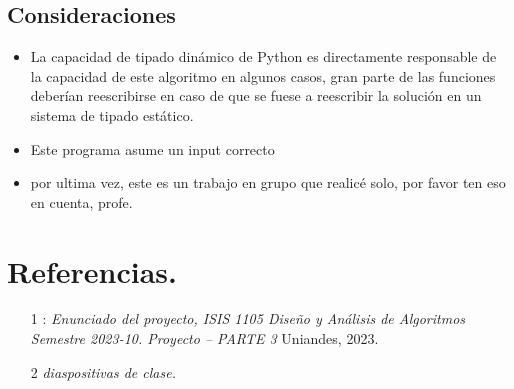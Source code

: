 \documentclass[a4paper]{article}
\begin{document}
\subsection{Consideraciones}
\begin{itemize}
    \item La capacidad de tipado dinámico de Python es directamente responsable de
    la capacidad de este algoritmo en algunos casos, gran parte de las funciones deberían reescribirse en caso de que se fuese a reescribir la solución
    en un sistema de tipado estático.
    \item Este programa asume un input correcto
    \item por ultima vez, este es un trabajo en grupo que realicé solo, por favor ten eso
    en cuenta, profe.

\end{itemize}
\section{Referencias.}
\begin{itemize}
    \item [1]: \textit{Enunciado del proyecto, ISIS 1105 Diseño y Análisis de Algoritmos
    Semestre 2023-10. Proyecto – PARTE 3} Uniandes, 2023.
    \item [2] \textit{diaspositivas de clase.}
\end{itemize}
\end{document}

